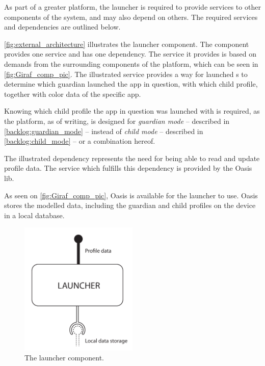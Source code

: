 \label{design:overview}
\label{sec:design_overview}
As part of a greater platform, the launcher is required to provide services to other components of the \giraf[] system, and may also depend on others.
The required services and dependencies are outlined below.

\autoref{fig:external_architecture} illustrates the \giraf[] launcher component. The component provides one service and has one dependency.
The service it provides is based on demands from the surrounding components of the \giraf[] platform, which can be seen in \autoref{fig:Giraf_comp_pic}.
The illustrated service provides a way for launched \girafapp[]s to determine which guardian launched the app in question, with which child profile, together with color data of the specific app.

Knowing which child profile the app in question was launched with is required, as the \giraf[] platform, as of writing, is designed for \emph{guardian mode} -- described in \autoref{backlog:guardian_mode} -- instead of \emph{child mode} -- described in \autoref{backlog:child_mode} -- or a combination hereof.

The illustrated dependency represents the need for being able to read and update profile data. The service which fulfills this dependency is provided by the Oasis lib. 

As seen on \autoref{fig:Giraf_comp_pic}, Oasis is available for the launcher to use. Oasis stores the modelled data, including the guardian and child profiles on the device in a local database.


\begin{figure}[h]
	\centering
	\includegraphics[width=0.5\textwidth]{gfx/external_launcher_architecture.pdf}
	\caption{The \giraf[] launcher component.}
	\label{fig:external_architecture}
\end{figure}

